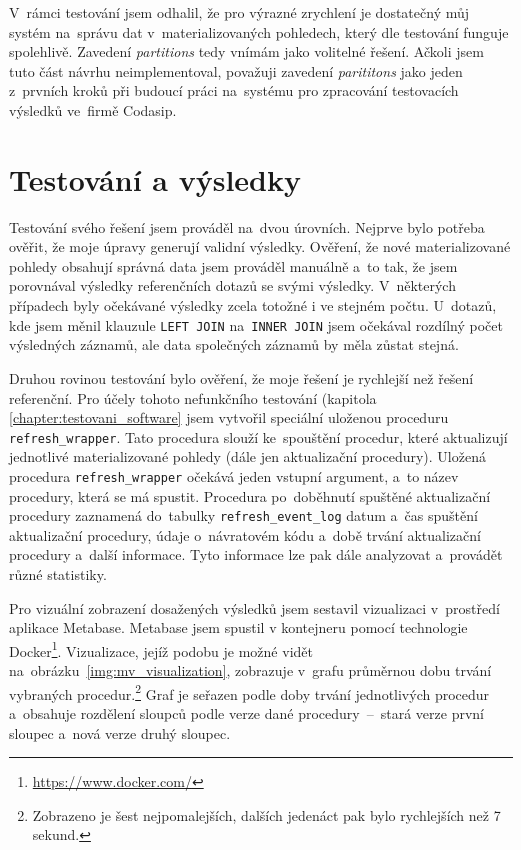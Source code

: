 V~rámci testování jsem odhalil, že pro výrazné zrychlení je dostatečný můj systém na~správu dat v~materializovaných pohledech, který dle testování funguje spolehlivě. Zavedení \textit{partitions} tedy vnímám jako volitelné řešení. Ačkoli jsem tuto část návrhu neimplementoval, považuji zavedení \textit{parititons} jako jeden z~prvních kroků při budoucí práci na~systému pro zpracování testovacích výsledků ve~firmě Codasip.



\chapter{Testování a výsledky}
\label{chapter:testovani_a_vysledky}
Testování svého řešení jsem prováděl na~dvou úrovních. Nejprve bylo potřeba ověřit, že moje úpravy generují
validní výsledky. Ověření, že nové materializované pohledy obsahují správná data jsem prováděl manuálně a~to
tak, že jsem porovnával výsledky referenčních dotazů se svými výsledky. V~některých případech byly očekávané výsledky zcela totožné i ve stejném počtu. U~dotazů, kde jsem měnil klauzule \texttt{LEFT JOIN}
na~\texttt{INNER JOIN} jsem očekával rozdílný počet výsledných záznamů, ale data společných záznamů by měla zůstat stejná.

Druhou rovinou testování bylo ověření, že moje řešení je rychlejší než řešení referenční. Pro účely tohoto
nefunkčního testování (kapitola \ref{chapter:testovani_software} jsem vytvořil speciální uloženou proceduru \texttt{refresh\_wrapper}. Tato
procedura slouží ke~spouštění procedur, které aktualizují jednotlivé materializované pohledy (dále jen
aktualizační procedury). Uložená procedura \texttt{refresh\_wrapper} očekává jeden vstupní argument, a~to název procedury,
která se má spustit. Procedura po~doběhnutí spuštěné aktualizační procedury zaznamená do~tabulky
\texttt{refresh\_event\_log} datum a~čas spuštění aktualizační procedury, údaje o~návratovém kódu a~době trvání
aktualizační procedury a~další informace. Tyto informace lze pak dále analyzovat a~provádět různé statistiky.

Pro vizuální zobrazení dosažených výsledků jsem sestavil vizualizaci v~prostředí aplikace Metabase. Metabase jsem spustil v kontejneru pomocí technologie Docker\footnote{\href{https://www.docker.com/}{https://www.docker.com/}}. Vizualizace, jejíž podobu je možné vidět na~obrázku~\ref{img:mv_visualization}, zobrazuje v~grafu průměrnou dobu trvání vybraných procedur.\footnote{Zobrazeno je šest nejpomalejších, dalších jedenáct pak bylo rychlejších než 7 sekund.} Graf je seřazen podle doby trvání jednotlivých procedur a~obsahuje rozdělení sloupců podle verze dané procedury~--~stará verze první sloupec a~nová verze druhý sloupec.

